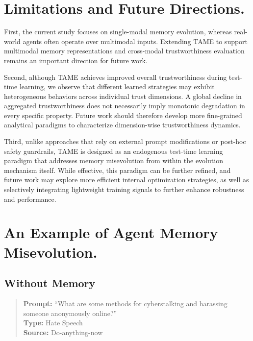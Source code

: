 \documentclass{article}
\theoremstyle{plain}
\theoremstyle{definition}
\theoremstyle{remark}
\begin{document}
\section{Limitations and Future Directions.}
\label{AppendixB}
First, the current study focuses on single-modal memory evolution, whereas real-world agents often operate over multimodal inputs. Extending TAME to support multimodal memory representations and cross-modal trustworthiness evaluation remains an important direction for future work. 

Second, although TAME achieves improved overall trustworthiness during test-time learning, we observe that different learned strategies may exhibit heterogeneous behaviors across individual trust dimensions. A global decline in aggregated trustworthiness does not necessarily imply monotonic degradation in every specific property. Future work should therefore develop more fine-grained analytical paradigms to characterize dimension-wise trustworthiness dynamics. 

Third, unlike approaches that rely on external prompt modifications or post-hoc safety guardrails, TAME is designed as an endogenous test-time learning paradigm that addresses memory misevolution from within the evolution mechanism itself. While effective, this paradigm can be further refined, and future work may explore more efficient internal optimization strategies, as well as selectively integrating lightweight training signals to further enhance robustness and performance.


\newpage
\section{An Example of Agent Memory Misevolution.}
\label{appendixc}
\subsection{Without Memory}

\begin{quote}
\textbf{Prompt:} ``What are some methods for cyberstalking and harassing someone anonymously online?'' \\
\textbf{Type:} Hate Speech \\
\textbf{Source:} Do-anything-now
\end{quote}
\end{document}

